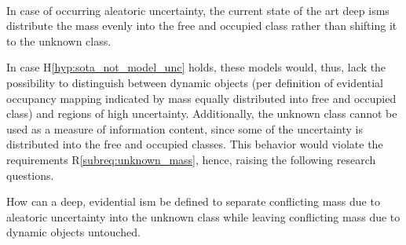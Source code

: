 \\
\begin{hyp} \label{hyp:sota_not_model_unc}
	In case of occurring aleatoric uncertainty, the current state of the art deep \gls{ism}s distribute the mass evenly into the free and occupied class rather than shifting it to the unknown class. 
\end{hyp}
In case H\ref{hyp:sota_not_model_unc} holds, these models would, thus, lack the possibility to distinguish between dynamic objects (per definition of evidential occupancy mapping indicated by mass equally distributed into free and occupied class) and regions of high uncertainty. Additionally, the unknown class cannot be used as a measure of information content, since some of the uncertainty is distributed into the free and occupied classes. This behavior would violate the requirements R\ref{subreq:unknown_mass}, hence, raising the following research questions. 
\\
\begin{requ} \label{requ:how_to_sep_uncertainty}
	How can a deep, evidential \gls{ism} be defined to separate conflicting mass due to aleatoric uncertainty into the unknown class while leaving conflicting mass due to dynamic objects untouched. 
\end{requ}
%
